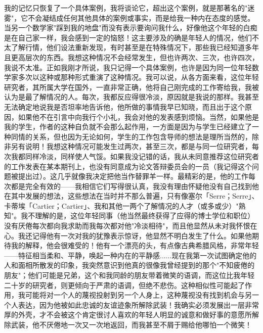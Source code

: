 我的记忆只恢复了一个具体案例，我将谈论它，超出这个案例，就是那著名的"迷雾"，它不会凝结成任何其他具体的案例或事实，而是给我一种内在态度的感觉。当另一个数学家"踩到我的地盘"而没有表示要询问我什么，好像他这个年轻的白痴是在自己家一样，我会感到一定的恼怒！这主要涉及的确是年轻人的情况，他们不太了解行情，他们设法重新发现，有时甚至是在特殊情况下，那些我已经知道多年且更高层次的东西。我想这种情况不会经常发生，但也许两次、三次，也许四次，我说不太准。正如我刚才所说，我只记得一个具体案例，也许是因为同一位年轻数学家多次以这种或那种形式重演了这种情况。我可以说，从各方面来看，这位年轻研究者，其所属大学在国外，一直非常正确，他将自己刚完成的工作寄给我，我被认为是最了解情况的人。每次，我都反应得很冷淡，原因就是我说的那样。我甚至无法确定地说我是否坦率地告诉他，他所做的事情我早已知晓，而且出于这个原因，如果他不在引言中向我行个小礼，我会对他的发表感到烦恼。当然，如果他是我的学生，作者的这种自负就不会那么起作用，一方面是因为与学生已经建立了一种同情的关系，但也因为无论如何，学生的工作包含导师的想法是理所当然的，除非另有说明！我想这种情况可能发生过两次，甚至三次，都是与同一位研究者，每次我都同样冷淡，同样使人气馁。如果我没记错的话，我从未同意推荐这位研究者的工作发表在某本期刊上，也没有同意成为论文答辩委员会的一员（我记得这个问题被提出过）。这几乎就像我决定把他当作替罪羊一样。最精彩的是，他的工作每次都是完全有效的——我相信它们写得很认真，我没有理由怀疑他没有自己找到他在其中发展的想法，这些想法在当时并不那么普遍，只有像塞尔「Serre；Serre」、卡蒂埃「Cartier；Cartier」、我和其他一两个了解情况的人才（或多或少）"熟知"。我不理解的是，这位年轻同事（他当然最终获得了应得的博士学位和职位）没有厌倦每次都向我求助而我每次都对他"冷淡相待"，而且他显然从未对我怀恨在心。我还记得他有一次对我的犹豫表示惊讶，他显然不明白发生了什么。如果他期待我的解释，他会很难受的！他有一个漂亮的头，有点像古典希腊风格，非常年轻——特征相当柔和、平静，唤起一种内在的平静感......现在我第一次试图确定他的人和面相所散发的印象，我突然意识到他真的很像我曾经提到的那个"不知疲倦的朋友"；他们可能是兄弟，这个和我同龄的朋友带着微笑的语调，而这位比我年轻二十岁的研究者，则更倾向于严肃的语调，但绝不悲伤。这种相似性可能起了作用，我可能将对一个人的蔑视投射到另一个人身上，这种蔑视没有找到机会与另一个人表达，因为他被如此忠诚的友谊迹象所解除武装！我确实必须发展出一层非常厚的外壳，才不会被这个肯定很讨人喜欢的年轻人明显的诚意和做好事的意愿所解除武装，他不厌倦地一次又一次地返回，而我甚至不屑于赐给他哪怕一个微笑！